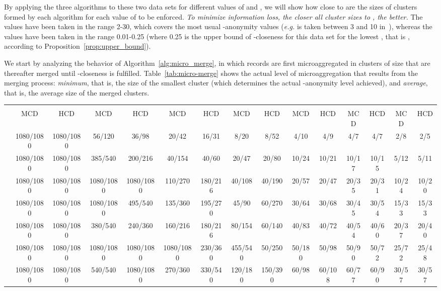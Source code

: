 \documentclass[10pt,journal,compsoc]{IEEEtran}
\theoremstyle{definition}
\theoremstyle{plain}
\begin{document}
By applying the three algorithms to these two data sets
for different values of  and , we will show 
how close to  are the sizes of clusters formed by 
each algorithm for each value of  to be enforced.
{\em To minimize information loss, the closer 
all cluster sizes to , the better.}
The  values have been taken in the range 2-30, 
which covers the most usual -anonymity values ({\em e.g.} 
 is taken between 3 and 10 in~\cite{Domingo01}),
whereas the  values have been taken in the range 0.01-0.25 
(where 0.25 is the upper bound of -closeness for this data set for 
the lowest , that is , 
according to Proposition~\ref{prop:upper_bound}).

We start by analyzing the behavior of Algorithm~\ref{alg:micro_merge}, 
in which records are first microaggregated in clusters of size  that 
are thereafter merged until -closeness is fulfilled. Table~\ref{tab:micro-merge} shows the
actual level of microaggregation that results from the merging process: 
{\em minimum}, that is, the size of the smallest cluster 
(which determines the actual -anonymity level achieved), 
and {\em average},
that is, the average size of the merged clusters.

\begin{table*}
\caption{\label{tab:micro-merge}Algorithm~\ref{alg:micro_merge}: actual microaggregation (minimum and average
size of the clusters, respectively) resulting for several values of  and  for the MCD and HCD data sets}
\centering
\scriptsize
\begin{tabular}{|l|cc|cc|cc|cc|cc|cc|cc|}\hline
 & \multicolumn{2}{c|}{} & \multicolumn{2}{c|}{} & \multicolumn{2}{c|}{} & \multicolumn{2}{c|}{} & \multicolumn{2}{c|}{} & \multicolumn{2}{c|}{} & \multicolumn{2}{c|}{}\\
& MCD & HCD & MCD & HCD & MCD & HCD & MCD & HCD & MCD & HCD & MCD & HCD & MCD & HCD\\
\hline
 & 1080/1080 & 1080/1080  & 56/120 & 36/98  & 20/42 & 16/31 & 8/20 & 8/52 & 4/10 & 4/9 & 4/7 & 4/7 & 2/8 & 2/5 \\
 & 1080/1080 & 1080/1080  & 385/540 & 200/216  & 40/154 & 40/60 & 20/47 & 20/80 & 10/24 & 10/21 & 10/17 & 10/15 & 5/12 & 5/11 \\
 & 1080/1080 & 1080/1080  & 1080/1080 & 1080/1080  & 110/270 & 180/216 & 40/108 & 40/190 & 20/57 & 20/47 & 20/35 & 20/31 & 10/24 & 10/20 \\
 & 1080/1080 & 1080/1080  & 1080/1080 & 495/540  & 135/360 & 195/270 & 45/90 & 60/270 & 30/64 & 30/68 & 30/45 & 30/54 & 15/33 & 15/33 \\
 & 1080/1080 & 1080/1080  & 380/540 & 240/360  & 160/216 & 180/216 & 80/154 & 60/140 & 40/83 & 40/72 & 40/54 & 40/60 & 20/37 & 20/40 \\
 & 1080/1080 & 1080/1080  & 1080/1080 & 1080/1080  & 1080/1080 & 230/360 & 455/540 & 50/250 & 50/180 & 50/98 & 50/90 & 50/72 & 25/72 & 25/48 \\
 & 1080/1080 & 1080/1080  & 540/540 & 1080/1080  & 270/360 & 330/540 & 120/180 & 150/390 & 60/98 & 60/108 & 60/77 & 60/90 & 30/57 & 30/57 \\
\hline
\end{tabular}
\end{table*} 
\end{document}
